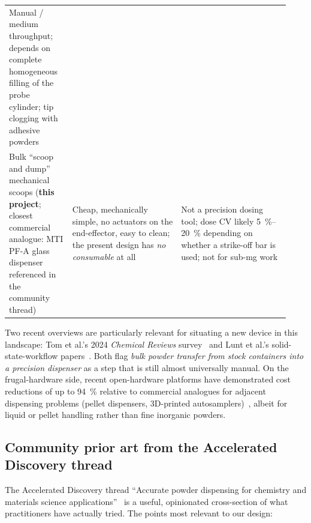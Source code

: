 \documentclass[11pt,a4paper]{article}
\begin{document}
\begin{small}
\begin{longtable}{@{}p{0.21\linewidth}p{0.36\linewidth}p{0.36\linewidth}@{}}
Manual / medium throughput; depends on complete homogeneous filling of the
probe cylinder; tip clogging with adhesive
powders~\cite{alsenz2011powderpickinganinexpensive} \\
\addlinespace
Bulk ``scoop and dump'' mechanical scoops (\textbf{this project}; closest
commercial analogue: MTI PF-A glass dispenser referenced in the community
thread)~\cite{mtipfaglassdispenser} &
Cheap, mechanically simple, no actuators on the end-effector, easy to clean;
the present design has \emph{no consumable} at all &
Not a precision dosing tool; dose CV likely \SIrange{5}{20}{\percent}
depending on whether a strike-off bar is used; not for sub-mg work \\
\end{longtable}
\end{small}

Two recent overviews are particularly relevant for situating a new device
in this landscape: Tom et al.'s 2024 \emph{Chemical Reviews}
survey~\cite{tom2024selfdrivinglaboratoriesfor} and Lunt et al.'s
solid-state-workflow papers~\cite{lunt2023modularmultirobotintegration,lunt2024aroboticworkflow}.
Both flag \emph{bulk powder transfer from stock containers into a precision
dispenser} as a step that is still almost universally manual. On the
frugal-hardware side, recent open-hardware platforms have demonstrated cost
reductions of up to \SI{94}{\percent} relative to commercial analogues for
adjacent dispensing problems (pellet dispensers, 3D-printed
autosamplers)~\cite{hernandezdelvalle2024pelletdispensomixerand,doloi2025democratizingselfdrivinglabs},
albeit for liquid or pellet handling rather than fine inorganic powders.

\subsection{Community prior art from the Accelerated Discovery thread}
\label{sec:thread}

The Accelerated Discovery thread ``Accurate powder dispensing for chemistry
and materials science applications''~\cite{accdiscthread} is a useful,
opinionated cross-section of what practitioners have actually tried. The
points most relevant to our design:
\end{document}
